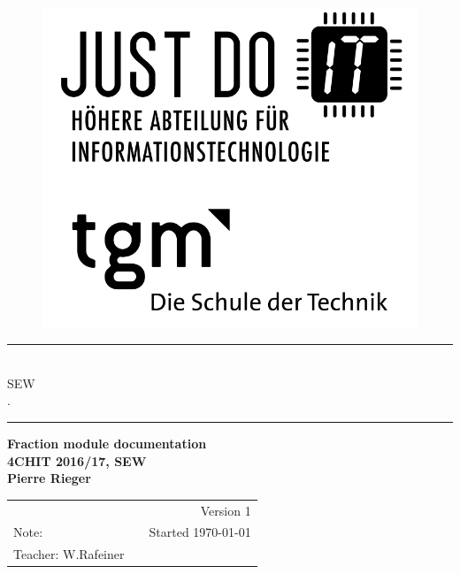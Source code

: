 \documentclass[letterpaper, 12pt]{article}
\gdef\mytitle{SEW}
\gdef\mythema{.}
\gdef\mysubject{Fraction module documentation}
\gdef\mycourse{4CHIT 2016/17, SEW}
\gdef\myauthor{Pierre Rieger}
\gdef\myversion{1}
\gdef\mybegin{Started \today}
\gdef\myfinish{ }
\gdef\mygrade{Note:}
\gdef\myteacher{Teacher: W.Rafeiner}
\begin{document}
\begin{titlepage}
	
	\begin{figure}[!h]
		\begin{flushright}
			\includegraphics[width=0.3\linewidth]{img/jdIT_tgm.png}
		\end{flushright}
	\end{figure}
	
	\vspace{2.5cm} 
	
	{\begin{center} \bfseries\huge
			\rule{17.5cm}{0.1mm}  
			\\[5mm]
			\mytitle\\[5mm]
			\mythema\\
			\rule{17.5cm}{0.1mm}  
		\end{center}}
		
		{\begin{flushright} \bfseries\Large
				\vspace{2cm}
				\mysubject\\
				\mycourse\\[10mm]
				\myauthor\\[10mm]
			\end{flushright}}
			
			{\begin{table}[!h] \bfseries\normalsize
					\begin{tabularx}{\textwidth}{lXr @{\hspace{0mm}}}
						&& Version \myversion\\
						\mygrade && \mybegin\\
						\myteacher && \myfinish\\
					\end{tabularx}
				\end{table}}
				
\end{titlepage}
			
	\parindent 0pt
	\parskip 6pt
	\newpage
	\tableofcontents
	\newpage
	\pagestyle{fancy}
	
\end{document}
